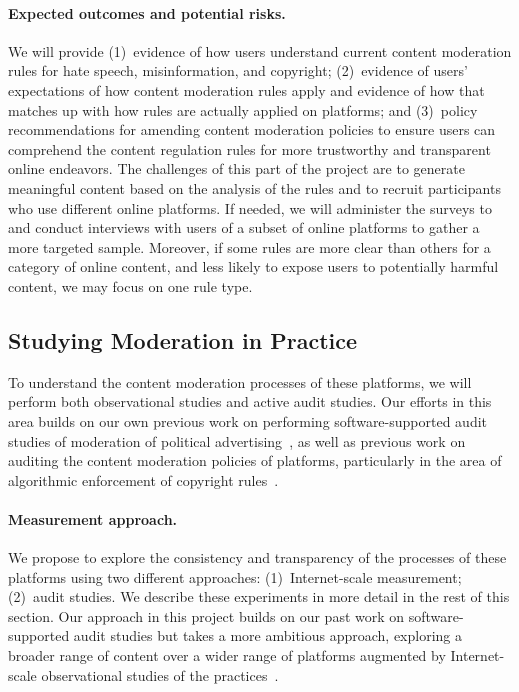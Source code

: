 \paragraph{Expected outcomes and potential risks.} We will provide
(1)~evidence of how users
understand current content moderation rules for hate speech, misinformation,
and copyright; (2)~evidence of users' expectations of how content moderation
rules apply and evidence of how that matches up with how rules are actually
applied on platforms; and (3)~policy recommendations for amending content
moderation policies to ensure users can comprehend the content regulation
rules for more trustworthy and transparent online endeavors. The challenges of
this part of the project are to generate meaningful content based on the
analysis of the rules and to recruit participants who use different online platforms.
If needed, we will administer the surveys to and conduct interviews with users of a subset of online
platforms to gather a more targeted sample. Moreover, if some rules are more clear
than others for a category of online content, and less likely to expose users to potentially harmful content,
we may focus on one rule type.  

\subsection{Studying Moderation in Practice}
\label{sec:auditing}

To understand the content moderation processes of these platforms, we will
perform both observational studies and active audit studies. Our efforts in
this area builds on our own previous work on performing software-supported
audit studies of moderation of political
advertising~\cite{hounsel2021software}, as well as previous work on auditing
the content moderation policies of platforms, particularly in the area of
algorithmic enforcement of copyright rules~\cite{perel2017black,
gray2020playing}.  

\paragraph{Measurement approach.} We propose to explore the consistency and
transparency of the processes of these platforms using two different
approaches: (1)~Internet-scale measurement; (2)~audit studies.  We describe
these experiments in more detail in the rest of this section.  Our approach in
this project builds on our past work on software-supported audit studies but
takes a more ambitious approach, exploring a broader range of content over a
wider range of platforms augmented by Internet-scale observational studies of the
practices~\cite{hounsel2021software}.  


